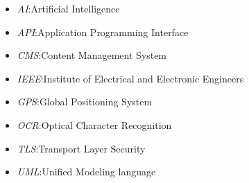 \begin{itemize}
	\item \textit{AI}:\@ Artificial Intelligence
	\item \textit{API}:\@ Application Programming Interface
	\item \textit{CMS}:\@ Content Management System
	\item \textit{IEEE}:\@ Institute of Electrical and Electronic Engineers
	\item \textit{GPS}:\@ Global Positioning System
	\item \textit{OCR}:\@ Optical Character Recognition
	\item \textit{TLS}:\@ Transport Layer Security
	\item \textit{UML}:\@ Unified Modeling language
\end{itemize}